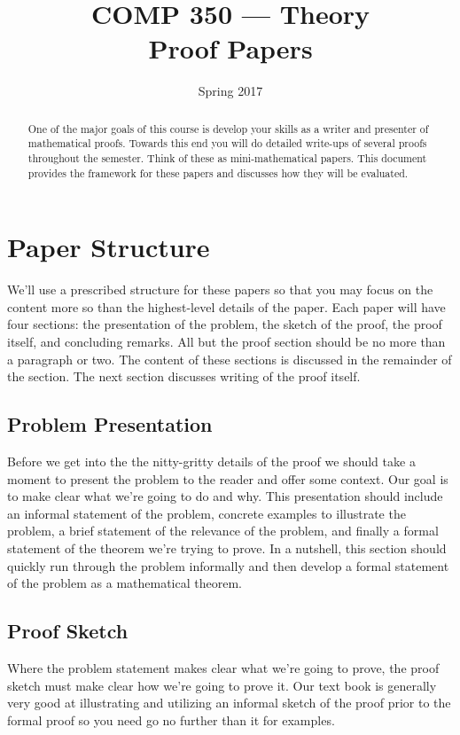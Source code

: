 \documentclass{tufte-handout}
\title{COMP 350 --- Theory \\  Proof Papers}
\author{  }
\date{Spring 2017}
\begin{document}
\maketitle

\begin{abstract}
One of the major goals of this course is develop your skills as a writer and presenter of mathematical proofs. Towards this end you will do detailed write-ups of several proofs throughout the semester. Think of these as mini-mathematical papers. This document provides the framework for these papers and discusses how they will be evaluated.
\end{abstract}

\section{Paper Structure}

We'll use a prescribed structure for these papers so that you may focus on the content more so than the highest-level details of the paper. Each paper will have four sections: the presentation of the problem, the sketch of the proof, the proof itself, and concluding remarks. All but the proof section should be no more than a paragraph or two. The content of these sections is discussed in the remainder of the section. The next section discusses writing of the proof itself.

\subsection{ Problem Presentation }

Before we get into the the nitty-gritty details of the proof we should take a moment to present the problem to the reader and offer some context. Our goal is to make clear what we're going to do and why. This presentation should include an informal statement of the problem, concrete examples to illustrate the problem, a brief statement of the relevance of the problem, and finally a formal statement of the theorem we're trying to prove.  In a nutshell, this section should quickly run through the problem informally and then develop a formal statement of the problem as a mathematical theorem.

\subsection{ Proof Sketch }

Where the problem statement makes clear what we're going to prove, the proof sketch must make clear how we're going to prove it. Our text book is generally very good at illustrating and utilizing an informal sketch of the proof prior to the formal proof so you need go no further than it for examples.
\end{document}

